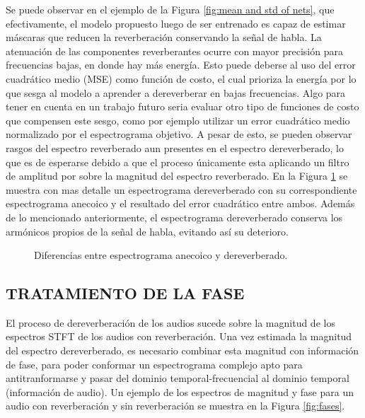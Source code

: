 Se puede observar en el ejemplo de la Figura \ref{fig:mean and std of nets}, que efectivamente, el modelo propuesto luego de ser entrenado es capaz de estimar máscaras que reducen la reverberación conservando la señal de habla. 
La atenuación de las componentes reverberantes ocurre con mayor precisión para frecuencias bajas, en donde hay más energía. Esto puede deberse al uso del error cuadrático medio (MSE) como función de costo, el cual prioriza la energía por lo que sesga al modelo a aprender a dereverberar en bajas frecuencias. Algo para tener en cuenta en un trabajo futuro seria evaluar otro tipo de funciones de costo que compensen este sesgo, como por ejemplo utilizar un error cuadrático medio normalizado por el espectrograma objetivo.
A pesar de esto, se pueden observar rasgos del espectro reverberado aun presentes en el espectro dereverberado, lo que es de esperarse debido a que el proceso únicamente esta aplicando un filtro de amplitud por sobre la magnitud del espectro reverberado. En la Figura \ref{fig:zoom} se muestra con mas detalle un espectrograma dereverberado con su correspondiente espectrograma anecoico y el resultado del error cuadrático entre ambos. Además de lo mencionado anteriormente, el espectrograma dereverberado conserva los armónicos propios de la señal de habla, evitando así su deterioro.

\begin{figure}[H]\centering
{}\hfill
{}\par 
{}
\caption{Diferencias entre espectrograma anecoico y dereverberado.}
\label{fig:zoom}
\end{figure}


\subsection[Tratamiento de la Fase]{TRATAMIENTO DE LA FASE}
El proceso de dereverberación de los audios sucede sobre la magnitud de los espectros STFT de los audios con reverberación. Una vez estimada la magnitud del espectro dereverberado, es necesario combinar esta magnitud con información de fase, para poder conformar un espectrograma complejo apto para antitranformarse y pasar del dominio temporal-frecuencial al dominio temporal (información de audio). Un ejemplo de los espectros de magnitud y fase para un audio con reverberación y sin reverberación se muestra en la Figura \ref{fig:fases}.

